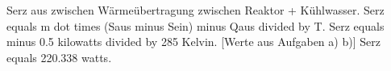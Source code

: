 Serz aus zwischen Wärmeübertragung zwischen Reaktor + Kühlwasser.
Serz equals m dot times (Saus minus Sein) minus Qaus divided by T.
Serz equals minus 0.5 kilowatts divided by 285 Kelvin.
[Werte aus Aufgaben a) b)]
Serz equals 220.338 watts.